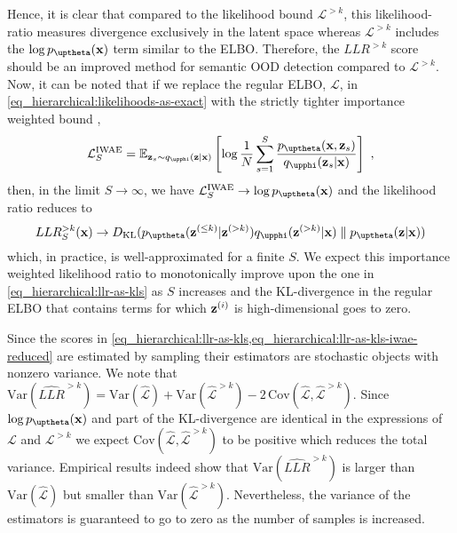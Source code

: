 {Hence, it is clear that compared to the likelihood bound $\mathcal{L}^{>k}$, this likelihood-ratio measures divergence exclusively in the latent space whereas $\mathcal{L}^{>k}$ includes the $\log p_\thetab(\xb)$ term similar to the ELBO.
Therefore, the $LLR^{>k}$ score should be an improved method for semantic OOD detection compared to $\mathcal{L}^{>k}$.
Now, it can be noted that if we replace the regular ELBO, $\mathcal{L}$, in \cref{eq_hierarchical:likelihoods-as-exact} with the strictly tighter importance weighted bound \parencite{burda_importance_2016},
\begin{equation}
    \mathcal{L}^{\text{IWAE}}_{S} = \mathbb{E}_{\zb_{s}\sim q_\phib(\zb|\xb)}\left[ \log \frac{1}{N} \sum_{s=1}^{S} \frac{p_\thetab(\xb, \zb_{s})}{q_\phib(\zb_{s}|\xb)} \right] \ , \label{eq_hierarchical:iw-bound}
\end{equation}
then, in the limit $S\rightarrow\infty$, we have $\mathcal{L}^{\text{IWAE}}_{S} \rightarrow \log p_\thetab(\xb)$ and the likelihood ratio reduces to
\begin{equation}\label{eq_hierarchical:llr-as-kls-iwae-reduced}
    LLR^{>k}_{S}(\xb) \rightarrow D_{\mathrm{KL}}( p_\thetab(\zb^{(\leq k)}|\zb^{(>k)}) q_\phib(\zb^{(>k)}|\xb) \parallel p_\thetab(\zb|\xb))
\end{equation}
which, in practice, is well-approximated for a finite $S$. We expect this importance weighted likelihood ratio to monotonically improve upon the one in \cref{eq_hierarchical:llr-as-kls} as $S$ increases and the KL-divergence in the regular ELBO that contains terms for which ${\mathbf{z}}^{(i)}$ is high-dimensional goes to zero.


Since the scores in \cref{eq_hierarchical:llr-as-kls,eq_hierarchical:llr-as-kls-iwae-reduced} are estimated by sampling their estimators are stochastic objects with nonzero variance.
We note that $\text{Var}(\widehat{LLR}^{>k}) = \text{Var}(\hat{\mathcal{L}}) + \text{Var}(\hat{\mathcal{L}}^{>k}) - 2\, \text{Cov}(\hat{\mathcal{L}}, \hat{\mathcal{L}}^{>k})$.
Since $\log p_\thetab(\xb)$ and part of the KL-divergence are identical in the expressions of $\mathcal{L}$ and $\mathcal{L}^{>k}$ we expect $\text{Cov}(\hat{\mathcal{L}}, \hat{\mathcal{L}}^{>k})$ to be positive which reduces the total variance. 
Empirical results indeed show that $\text{Var}(\widehat{LLR}^{>k})$ is larger than $\text{Var}(\hat{\mathcal{L}})$ but smaller than $\text{Var}(\hat{\mathcal{L}}^{>k})$.
Nevertheless, the variance of the estimators is guaranteed to go to zero as the number of samples is increased.

}
